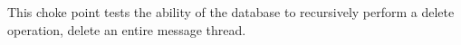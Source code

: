 
This choke point tests the ability of the database to recursively perform a delete operation, \eg delete an entire message thread.


